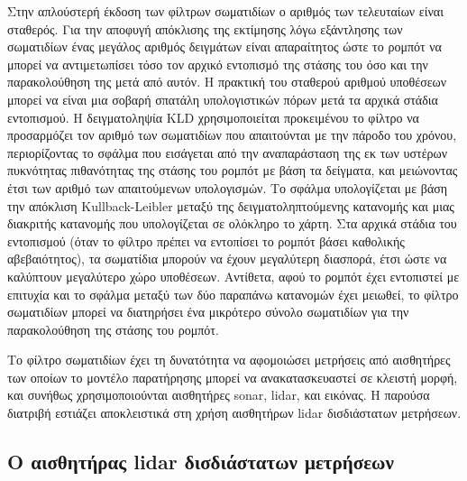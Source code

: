 Στην απλούστερή έκδοση των φίλτρων σωματιδίων ο αριθμός των τελευταίων είναι
σταθερός. Για την αποφυγή απόκλισης της εκτίμησης λόγω εξάντλησης των
σωματιδίων \cite{thrun2005probabilistic} ένας μεγάλος αριθμός δειγμάτων είναι
απαραίτητος ώστε το ρομπότ να μπορεί να αντιμετωπίσει τόσο τον αρχικό εντοπισμό
της στάσης του όσο και την παρακολούθηση της μετά από αυτόν. Η πρακτική του
σταθερού αριθμού υποθέσεων μπορεί να είναι μια σοβαρή σπατάλη υπολογιστικών
πόρων μετά τα αρχικά στάδια εντοπισμού. Η δειγματοληψία KLD \cite{Fox2001}
χρησιμοποιείται προκειμένου το φίλτρο να προσαρμόζει τον αριθμό των σωματιδίων
που απαιτούνται με την πάροδο του χρόνου, περιορίζοντας το σφάλμα που εισάγεται
από την αναπαράσταση της εκ των υστέρων πυκνότητας πιθανότητας της στάσης του
ρομπότ με βάση τα δείγματα, και μειώνοντας έτσι των αριθμό των απαιτούμενων
υπολογισμών. Το σφάλμα υπολογίζεται με βάση την απόκλιση Kullback-Leibler
μεταξύ της δειγματοληπτούμενης κατανομής και μιας διακριτής κατανομής που
υπολογίζεται σε ολόκληρο το χάρτη. Στα αρχικά στάδια του εντοπισμού (όταν το
φίλτρο πρέπει να εντοπίσει το ρομπότ βάσει καθολικής αβεβαιότητος), τα
σωματίδια μπορούν να έχουν μεγαλύτερη διασπορά, έτσι ώστε να καλύπτουν
μεγαλύτερο χώρο υποθέσεων. Αντίθετα, αφού το ρομπότ έχει εντοπιστεί με επιτυχία
και το σφάλμα μεταξύ των δύο παραπάνω κατανομών έχει μειωθεί, το φίλτρο
σωματιδίων μπορεί να διατηρήσει ένα μικρότερο σύνολο σωματιδίων για την
παρακολούθηση της στάσης του ρομπότ.

Το φίλτρο σωματιδίων έχει τη δυνατότητα να αφομοιώσει μετρήσεις από αισθητήρες
των οποίων το μοντέλο παρατήρησης μπορεί να ανακατασκευαστεί σε κλειστή μορφή,
και συνήθως χρησιμοποιούνται αισθητήρες sonar, lidar, και εικόνας. Η παρούσα
διατριβή εστιάζει αποκλειστικά στη χρήση αισθητήρων lidar δισδιάστατων
μετρήσεων.


\subsection{Ο αισθητήρας lidar δισδιάστατων μετρήσεων}
\label{subsec:01_01_02_4}

